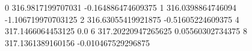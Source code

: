 0 316.9817199707031 -0.164886474609375
1 316.0398864746094 -1.106719970703125
2 316.63055419921875 -0.51605224609375
4 317.1466064453125 0.0
6 317.20220947265625 0.05560302734375
8 317.1361389160156 -0.010467529296875
